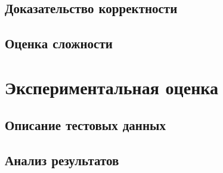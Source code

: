 \subsection{Доказательство корректности}
\subsection{Оценка сложности}
\section{Экспериментальная оценка}
\subsection{Описание тестовых данных}
\subsection{Анализ результатов}

